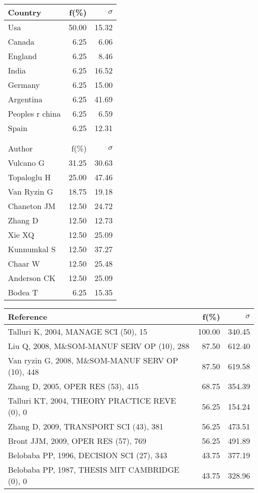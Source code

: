 \documentclass[a4paper,11pt]{report}
\begin{document}
\begin{landscape}
\begin{table}[!ht]
{\begin{tabular}{|l r r|}
\hline
\hline
Country & f(\%) & $\sigma$\\
\hline
Usa & 50.00 & 15.32\\
Canada & 6.25 & 6.06\\
England & 6.25 & 8.46\\
India & 6.25 & 16.52\\
Germany & 6.25 & 15.00\\
Argentina & 6.25 & 41.69\\
Peoples r china & 6.25 & 6.59\\
Spain & 6.25 & 12.31\\
 &  & \\
 &  & \\
\hline
\hline
Author & f(\%) & $\sigma$\\
\hline
Vulcano G & 31.25 & 30.63\\
Topaloglu H & 25.00 & 47.46\\
Van Ryzin G & 18.75 & 19.18\\
Chaneton JM & 12.50 & 24.72\\
Zhang D & 12.50 & 12.73\\
Xie XQ & 12.50 & 25.09\\
Kunnumkal S & 12.50 & 37.27\\
Chaar W & 12.50 & 25.48\\
Anderson CK & 12.50 & 25.09\\
Bodea T & 6.25 & 15.35\\
\hline
\end{tabular}
}
{\scriptsize\begin{tabular}{|l r r|}
\hline
Reference & f(\%) & $\sigma$\\
\hline
Talluri K, 2004, MANAGE SCI (50), 15 & 100.00 & 340.45\\
Liu Q, 2008, M\&SOM-MANUF SERV OP (10), 288 & 87.50 & 612.40\\
Van ryzin G, 2008, M\&SOM-MANUF SERV OP (10), 448 & 87.50 & 619.58\\
Zhang D, 2005, OPER RES (53), 415 & 68.75 & 354.39\\
Talluri KT, 2004, THEORY PRACTICE REVE (0), 0 & 56.25 & 154.24\\
Zhang D, 2009, TRANSPORT SCI (43), 381 & 56.25 & 473.51\\
Bront JJM, 2009, OPER RES (57), 769 & 56.25 & 491.89\\
Belobaba PP, 1996, DECISION SCI (27), 343 & 43.75 & 377.19\\
Belobaba PP, 1987, THESIS MIT CAMBRIDGE (0), 0 & 43.75 & 328.96\\

\end{tabular}}
\end{table}
\end{landscape}
\end{document}
